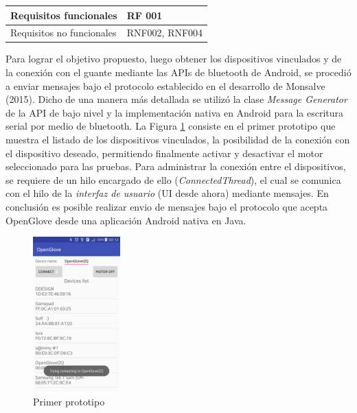 \begin{table}[H]
\begin{tabular}{|l|l|}
Requisitos funcionales    & RF 001                                                                                                                                                                                                                                                                                                                                                                                                             \\ \hline
Requisitos no funcionales & RNF002, RNF004                                                                                                                                                                                                                                                                                                                                                                                                     \\ \hline
\end{tabular}
\end{table}

Para lograr el objetivo propuesto, luego obtener los dispositivos vinculados y de la conexión con el guante mediante las APIs de bluetooth de Android, se procedió a enviar mensajes bajo el protocolo establecido en el desarrollo de Monsalve (2015). Dicho de una manera más detallada se utilizó la clase \textit{Message Generator} de la API de bajo nivel y la implementación nativa en Android para la escritura serial por medio de bluetooth. La Figura \ref{fig:prototype-01} consiste en el primer prototipo que muestra el listado de los dispositivos vinculados, la posibilidad de la conexión con el dispositivo deseado, permitiendo finalmente activar y desactivar el motor seleccionado para las pruebas. Para administrar la conexión entre el dispositivos, se requiere de un hilo encargado de ello (\textit{ConnectedThread}), el cual se comunica con el hilo de la \textit{interfaz de usuario} (UI desde ahora)  mediante mensajes. En conclusión es posible realizar envio de mensajes bajo el protocolo que acepta OpenGlove desde una aplicación Android nativa en Java.

\begin{figure}[H]
  \begin{center} 
   	\includegraphics[width=0.3\textwidth]{images/chapter03/01-prototype.png} 
    \caption{Primer prototipo} 
    \label{fig:prototype-01}
  \end{center}
\end{figure}



